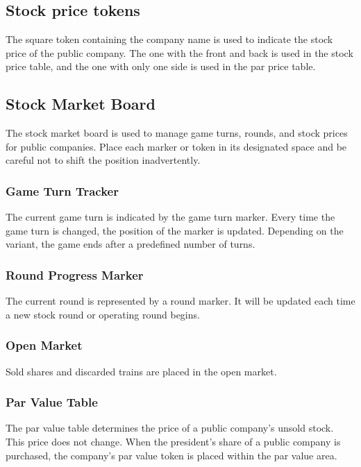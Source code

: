 \documentclass{article}
\begin{document}
\begin{CJK}{UTF8}{min}
\begin{multicols}{2}
\subsection{Stock price tokens}
The square token containing the company name is used to indicate the
stock price of the public company. The one with the front and back is
used in the stock price table, and the one with only one side is used
in the par price table.


\subsection{Stock Market Board}
The stock market board is used to manage game turns, rounds, and stock
prices for public companies. Place each marker or token in its
designated space and be careful not to shift the position
inadvertently.


\subsubsection{Game Turn Tracker}
The current game turn is indicated by the game turn marker. Every time
the game turn is changed, the position of the marker is
updated. Depending on the variant, the game ends after a predefined
number of turns.


\subsubsection{Round Progress Marker}
The current round is represented by a round marker. It will be
updated each time a new stock round or operating round begins.


\subsubsection{Open Market}
Sold shares and discarded trains are placed in the open market.


\subsubsection{Par Value Table}
The par value table determines the price of a public company's
unsold stock. This price does not change. When the president's share
of a public company is purchased, the company's par value token is
placed within the par value area.



\end{multicols}
\end{CJK}
\end{document}
